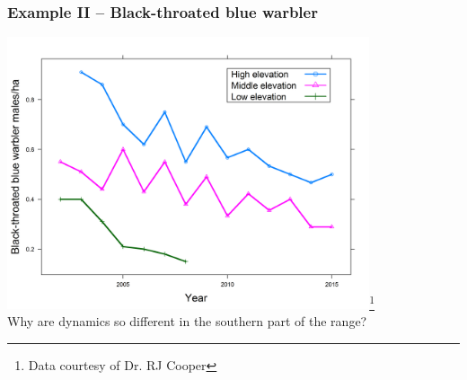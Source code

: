 \documentclass[color=usenames,dvipsnames]{beamer}
\begin{document}
\begin{frame}[fragile]
  \frametitle{Example II -- Black-throated blue warbler}
  \centering \small %
  \includegraphics[width=0.8\textwidth]{figs/blue_density3plots}\let\thefootnote\relax\footnote{\tiny Data courtesy of Dr. RJ Cooper} \\ 
  Why are dynamics so different in the southern part of
  the range? \\
\end{frame}
\end{document}

